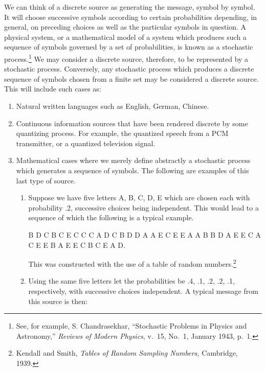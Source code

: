We can think of a discrete source as generating the message, symbol
by symbol.  It will choose successive symbols according to certain
probabilities depending, in general, on preceding choices as well as the
particular symbols in question.  A physical system, or a mathematical
model of a system which produces such a sequence of symbols governed by
a set of probabilities, is known as a stochastic process.\footnote{See,
for example, S. Chandrasekhar, ``Stochastic Problems in Physics and
Astronomy,'' {\it Reviews of Modern Physics}, v.~15, No.~1, January 1943,
p.~1.} We may consider a discrete source, therefore, to be represented by
a stochastic process.  Conversely, any stochastic process which produces
a discrete sequence of symbols chosen from a finite set may be considered
a discrete source.  This will include such cases as:
\begin{enumerate}
\item
Natural written languages such as English, German, Chinese.
\item
Continuous information sources that have been rendered discrete by some
quantizing process.
For example, the quantized speech from a PCM transmitter, or a quantized
television signal.
\item
Mathematical cases where we merely define abstractly a stochastic process
which generates a sequence of symbols.
The following are examples of this last type of source.
\begin{enumerate}
\renewcommand{\labelenumii}{(\Alph{enumii})}
\item
Suppose we have five letters A, B, C, D, E which are chosen each with
probability .2, successive choices being independent.  This would lead
to a sequence of which the following is a typical example.

B D C B C E C C C A D C B D D A A E C E E A\newline
A B B D A E E C A C E E B A E E C B C E A D.

This was constructed with the use of a table of random
numbers.\footnote{Kendall and Smith, {\it Tables of Random Sampling
Numbers,} Cambridge, 1939.}
\item
Using the same five letters let the probabilities be .4, .1, .2, .2,
.1, respectively, with successive choices independent.  A typical message
from this source is then:


\end{enumerate}
\end{enumerate}
